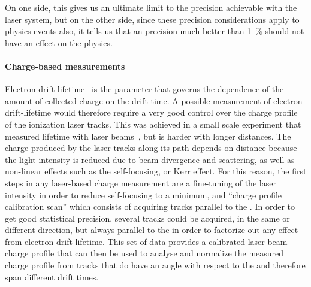 
On one side, this gives us an ultimate limit to the \efield precision achievable with the laser system, but on the other side, since these  precision considerations apply to physics events also, it tells us that an \efield precision much better than \SI{1}{\%} should not have an effect on the physics.


\paragraph{Charge-based measurements}

Electron drift-lifetime~\cite{bib:uBlifetime, Antonello:2014eha} is the parameter that governs the dependence of the amount of collected charge on the drift time. A possible measurement of electron drift-lifetime would therefore require a very good control over the charge profile of the ionization laser tracks. This was achieved in a small scale experiment that measured lifetime with laser beams~\cite{Ereditato:2013xaa}, but is harder with longer distances. The charge produced by the laser tracks along its path depends on distance because the light intensity is reduced due to beam divergence and scattering, as well as non-linear effects such as the self-focusing, or Kerr effect. For this reason, the first steps in any laser-based charge measurement are a fine-tuning of the laser intensity in order to reduce self-focusing to a minimum, and ``charge profile calibration scan'' which consists of acquiring tracks parallel to the . In order to get good statistical precision, several tracks could be acquired, in the same or different direction, but always parallel to the  in order to factorize out any effect from electron drift-lifetime. This set of data provides a calibrated laser beam charge profile that can then be used to analyse and normalize the measured charge profile from tracks that do have an angle with respect to the  and therefore span different drift times.


